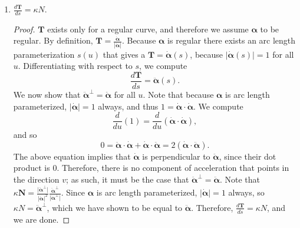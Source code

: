 \documentclass[12pt]{article}
\newcommand{\magnitude}[1]{\left\lvert #1 \right\rvert}
\begin{document}
\begin{enumerate}[label=\Alph*., leftmargin=*]
\begin{proof}
\begin{equation*}
      \magnitude{\bm{\dot{\alpha}}}=\sqrt{\dot{x}^2+\dot{y}^2}.
    \end{equation*}
    Using the identity proven in (A), we see that\begin{equation*}
      \kappa = \frac{ \bm{\dot{\alpha}}\times \bm{\ddot{\alpha}}}{(\magnitude{\bm{\dot{\alpha}}})^3}=\frac{\dot{x}\ddot{y}-\ddot{x}\dot{y}}{(\dot{x}^2+\dot{y}^2)^{3/2}}
    \end{equation*}
    Thus, we are done.
      \end{proof}
    \item $\frac{d\bm{T}}{ds}=\kappa N$. \begin{proof} $\bm{T}$ exists only for a regular curve, and therefore we assume $\bm{\alpha}$ to be regular. By definition, $\bm{T}=\frac{\bm{\dot{\alpha}}}{\vert\bm{\dot{\alpha}}\vert}$. Because $\bm{\alpha}$ is regular
          there exists an arc length parameterization $s(u)$ that gives a $\bm{T}=\bm{\dot{\alpha}}(s)$, because $\vert \bm{\dot{\alpha}}(s)\vert=1$ for all $u$. Differentiating with respect to $s$, we compute \begin{equation*}
            \frac{d\bm{T}}{ds}=\bm{\ddot{\alpha}}(s).
          \end{equation*} We now show that $\bm{\ddot{\alpha}}^{\perp}=\bm{\ddot{\alpha}}$ for all $u$. Note that because $\bm{\alpha}$ is arc length parameterized, $\vert \bm{\dot{\alpha}} \vert = 1$ always, and thus $1=\bm{\dot{\alpha}}\cdot\bm{\dot{\alpha}}$. We compute
          \begin{equation*}
            \frac{d}{du}(1)=\frac{d}{du}(\bm{\dot{\alpha}}\cdot\bm{\dot{\alpha}}),
          \end{equation*} and so
          \begin{equation*}
            0 = \bm{\ddot{\alpha}}\cdot\bm{\dot{\alpha}}+\bm{\dot{\alpha}}\cdot\bm{\ddot{\alpha}}=2(\bm{\dot{\alpha}}\cdot\bm{\ddot{\alpha}}).
          \end{equation*} The above equation implies that $\bm{\dot{\alpha}}$ is perpendicular to $\bm{\ddot{\alpha}}$, since their dot product is 0.
          Therefore, there is no component of acceleration that points in the direction $v$; as such, it must be the case that $\bm{\ddot{\alpha}}^{\perp}=\bm{\ddot{\alpha}}$.
          Note that $\kappa\bm{N} = \frac{\vert \bm{\ddot{\alpha}}^{\perp}\vert}{{\vert \bm{\dot{\alpha}}\vert}^2}\frac{\bm{\ddot{\alpha}}^{\perp}}{\vert\bm{\ddot{\alpha}}^{\perp}\vert}$. Since $\bm{\alpha}$ is arc length parameterized,
          $\vert \bm{\dot{\alpha}}\vert=1$ always, so $\kappa N=\bm{\ddot{\alpha}}^{\perp}$, which we have shown to be equal to $\bm{\ddot{\alpha}}$. Therefore, $\frac{d\bm{T}}{ds}=\kappa N$, and we are done. 

\end{proof}
\end{enumerate}
\end{document}
